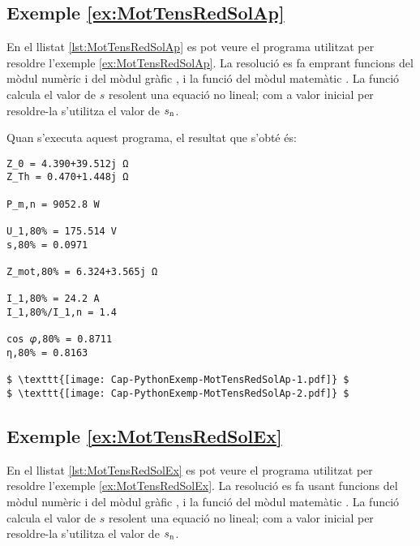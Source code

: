 \hypertarget{exemple:MotTensRedSolAp}{\subsection{Exemple \ref*{ex:MotTensRedSolAp} \MotTensRedSolAp}}
En el llistat \vref{lst:MotTensRedSolAp} es pot veure el programa utilitzat per resoldre l'exemple \vref{ex:MotTensRedSolAp}. La resolució es fa emprant funcions del mòdul numèric  i del mòdul gràfic , i la funció  del mòdul matemàtic . La funció  calcula el valor de $s$ resolent una equació no lineal; com a valor inicial per resoldre-la  s'utilitza el valor de $s_\mathrm{n}$.


Quan s'executa aquest programa, el resultat que s'obté és:
\lstset{
	language=,
	numbers=none,
	frame=none
}
\begin{lstlisting}[mathescape=true]
Z_0 = 4.390+39.512j Ω
Z_Th = 0.470+1.448j Ω

P_m,n = 9052.8 W

U_1,80% = 175.514 V
s,80% = 0.0971

Z_mot,80% = 6.324+3.565j Ω

I_1,80% = 24.2 A
I_1,80%/I_1,n = 1.4

cos 𝜑,80% = 0.8711
η,80% = 0.8163
	
$ \texttt{[image: Cap-PythonExemp-MotTensRedSolAp-1.pdf]} $
$ \texttt{[image: Cap-PythonExemp-MotTensRedSolAp-2.pdf]} $
\end{lstlisting} 



\hypertarget{exemple:MotTensRedSolEx}{\subsection{Exemple \ref*{ex:MotTensRedSolEx} \MotTensRedSolEx}}
En el llistat \vref{lst:MotTensRedSolEx} es pot veure el programa utilitzat per resoldre l'exemple \vref{ex:MotTensRedSolEx}. La resolució es fa usant funcions del mòdul numèric  i del mòdul gràfic , i la funció  del mòdul matemàtic . La funció  calcula el valor de $s$ resolent una equació no lineal; com a valor inicial per resoldre-la  s'utilitza el valor de $s_\mathrm{n}$.


